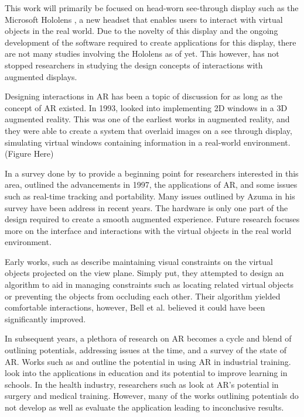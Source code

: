 This work will primarily be focused on head-worn see-through display such as the Microsoft Hololens \cite{Hololens}, a new headset that enables users to interact with virtual objects in the real world. Due to the novelty of this display and the ongoing development of the software required to create applications for this display, there are not many studies involving the Hololens as of yet. This however, has not stopped researchers in studying the design concepts of interactions with augmented displays. 

Designing interactions in AR has been a topic of discussion for as long as the concept of AR existed. In 1993, \cite{Feiner1993} looked into implementing 2D windows in a 3D augmented reality. This was one of the earliest works in augmented reality, and they were able to create a system that overlaid images on a see through display, simulating virtual windows containing information in a real-world environment. (Figure Here)

In a survey done by \cite{Azuma1997} to provide a beginning point for researchers interested in this area, outlined the advancements in 1997, the applications of AR, and some issues such as real-time tracking and portability. Many issues outlined by Azuma in his survey have been address in recent years. The hardware is only one part of the design required to create a smooth augmented experience. Future research focuses more on the interface and interactions with the virtual objects in the real world environment.

Early works, such as \cite{Bell2001} describe maintaining visual constraints on the virtual objects projected on the view plane. Simply put, they attempted to design an algorithm to aid in managing constraints such as locating related virtual objects or preventing the objects from occluding each other. Their algorithm yielded comfortable interactions, however, Bell et al. believed it could have been significantly improved. 

In subsequent years, a plethora of research on AR becomes a cycle and blend of outlining potentials, addressing issues at the time, and a survey of the state of AR. Works such as \cite{Zhong2003} and \cite{Boulanger2004} outline the potential in using AR in industrial training. \cite{Bower2014} look into the applications in education and its potential to improve learning in schools. In the health industry, researchers such as \cite{Barsom2016, Chan2017, Chen2015, Okamoto2015} look at AR's potential in surgery and medical training. However, many of the works outlining potentials do not develop as well as evaluate the application leading to inconclusive results.

